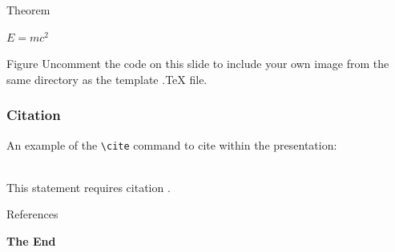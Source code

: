\documentclass[aspectratio=169,xcolor=dvipsnames]{beamer}
\begin{document}
\begin{frame}{Theorem}
    \begin{theorem}
        $E = mc^2$
    \end{theorem}
\end{frame}


\begin{frame}{Figure}
    Uncomment the code on this slide to include your own image from the same directory as the template .TeX file.
\end{frame}


\begin{frame}[fragile] %
    \frametitle{Citation}
    An example of the \verb|\cite| command to cite within the presentation:\\~

    This statement requires citation \cite{p1}.
\end{frame}


\begin{frame}{References}
    \footnotesize
    
    
\end{frame}


\begin{frame}
    \Huge{\centerline{\textbf{The End}}}
    \
\end{frame}

\end{document}
